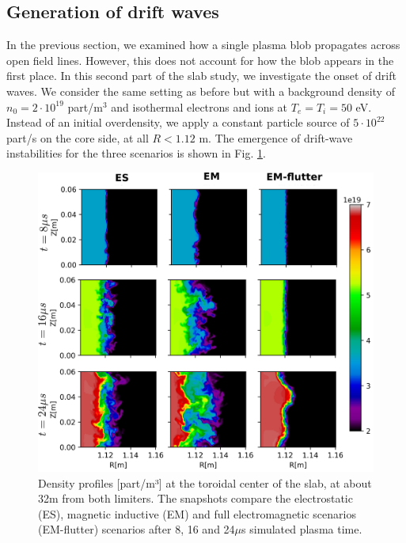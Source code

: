 \subsection{Generation of drift waves}
\label{ssec:plasmaturbslab}

In the previous section, we examined how a single plasma blob propagates across open field lines. However, this does not account for how the blob appears in the first place. In this second part of the slab study, we investigate the onset of drift waves. We consider the same setting as before but with a background density of $n_0 = 2 \cdot 10^{19}$ part/m$^3$ and isothermal electrons and ions at $T_e = T_i = 50$ eV. Instead of an initial overdensity, we apply a constant particle source of $5 \cdot 10^{22}$ part/s on the core side, at all $R < 1.12$ m. The emergence of drift-wave instabilities for the three scenarios is shown in Fig. \ref{fig:SLABturb}. \newline

\begin{figure}[H]\centering
	\centering
	\includegraphics[width=.95\textwidth]{schemes/slab_source.png}
	\caption{Density profiles [part/m³] at the toroidal center of the slab, at about 32m from both limiters. The snapshots compare the electrostatic (ES), magnetic inductive (EM) and full electromagnetic scenarios (EM-flutter) scenarios after 8, 16 and 24$\mu$s simulated plasma time.}
	\label{fig:SLABturb}
\end{figure}


